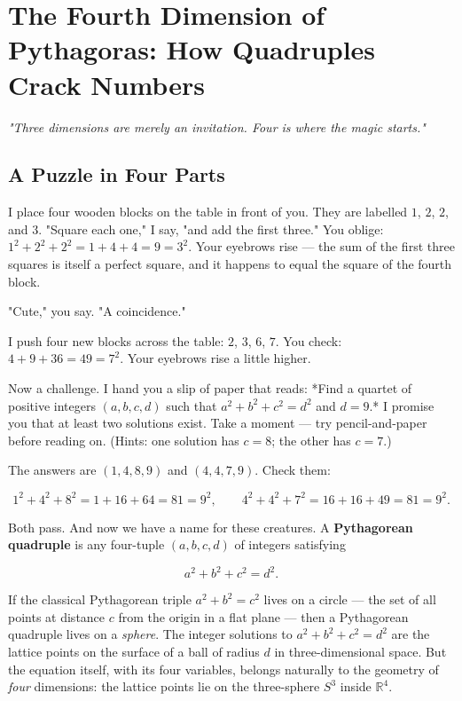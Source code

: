 \chapter{The Fourth Dimension of Pythagoras: How Quadruples Crack Numbers}


\bigskip


\begin{displayquote}
\textit{"Three dimensions are merely an invitation. Four is where the magic starts."}
\end{displayquote}


\bigskip

\section*{A Puzzle in Four Parts}

I place four wooden blocks on the table in front of you. They are labelled $1$, $2$, $2$, and $3$. "Square each one," I say, "and add the first three." You oblige: $1^2 + 2^2 + 2^2 = 1 + 4 + 4 = 9 = 3^2$. Your eyebrows rise --- the sum of the first three squares is itself a perfect square, and it happens to equal the square of the fourth block.

"Cute," you say. "A coincidence."

I push four new blocks across the table: $2$, $3$, $6$, $7$. You check: $4 + 9 + 36 = 49 = 7^2$. Your eyebrows rise a little higher.

Now a challenge. I hand you a slip of paper that reads: *Find a quartet of positive integers $(a, b, c, d)$ such that $a^2 + b^2 + c^2 = d^2$ and $d = 9$.* I promise you that at least two solutions exist. Take a moment --- try pencil-and-paper before reading on. (Hints: one solution has $c = 8$; the other has $c = 7$.)

The answers are $(1, 4, 8, 9)$ and $(4, 4, 7, 9)$. Check them:

\[
1^2 + 4^2 + 8^2 = 1 + 16 + 64 = 81 = 9^2, \qquad 4^2 + 4^2 + 7^2 = 16 + 16 + 49 = 81 = 9^2.
\]

Both pass. And now we have a name for these creatures. A \textbf{Pythagorean quadruple} is any four-tuple $(a, b, c, d)$ of integers satisfying

\[
a^2 + b^2 + c^2 = d^2.
\]

If the classical Pythagorean triple $a^2 + b^2 = c^2$ lives on a circle --- the set of all points at distance $c$ from the origin in a flat plane --- then a Pythagorean quadruple lives on a \textit{sphere}. The integer solutions to $a^2 + b^2 + c^2 = d^2$ are the lattice points on the surface of a ball of radius $d$ in three-dimensional space. But the equation itself, with its four variables, belongs naturally to the geometry of \textit{four} dimensions: the lattice points lie on the three-sphere $S^3$ inside $\mathbb{R}^4$.

